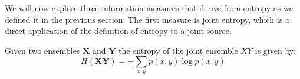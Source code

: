 %
%

We will now explore three information measures that derive from entropy as we defined it in the previous section. The first measure is joint entropy, which is a direct application of the definition of entropy to a joint source.
\begin{definition}
Given two ensembles $\mathbf{X}$ and $\mathbf{Y}$ the entropy of the joint ensemble $XY$ is given by:
\begin{equation}
H(\mathbf{XY}) = - \sum_{x,y} p(x,y)\log p(x,y)
\end{equation}
\end{definition}

